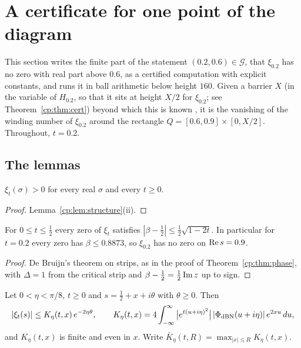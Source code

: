 \section{A certificate for one point of the diagram}\label{cp:sec:cert}

This section writes the finite part of the statement $(0.2,0.6)\in\mathcal G$, that $\xi_{0.2}$ has no zero with real part above $0.6$, as a certified computation with explicit constants, and runs it in ball arithmetic below height $160$. Given a barrier $X$ (in the variable of $H_{0.2}$, so that it sits at height $X/2$ for $\xi_{0.2}$; see Theorem~\ref{cp:thm:cert}) beyond which this is known \cite{Polymath}, it is the vanishing of the winding number of $\xi_{0.2}$ around the rectangle $Q=[0.6,0.9]\times[0,X/2]$. Throughout, $t=0.2$.

\subsection{The lemmas}\label{cp:sec:lemmas}

\begin{lemma}\label{cp:lem:bottom}
$\xi_t(\sigma)>0$ for every real $\sigma$ and every $t\ge0$.
\end{lemma}

\begin{proof}
Lemma~\ref{cp:lem:structure}(ii).
\end{proof}

\begin{lemma}\label{cp:lem:right}
For $0\le t\le\frac12$ every zero of $\xi_t$ satisfies $|\beta-\frac12|\le\frac12\sqrt{1-2t}$. In particular for $t=0.2$ every zero has $\beta\le0.8873$, so $\xi_{0.2}$ has no zero on $\operatorname{Re} s=0.9$.
\end{lemma}

\begin{proof}
De Bruijn's theorem on strips, as in the proof of Theorem~\ref{cp:thm:phase}, with $\Delta=1$ from the critical strip and $\beta-\frac12=\frac12\operatorname{Im} z$ up to sign.
\end{proof}

\begin{lemma}\label{cp:lem:tilt}
Let $0<\eta<\pi/8$, $t\ge0$ and $s=\frac12+x+i\theta$ with $\theta\ge0$. Then
\[
|\xi_t(s)|\le K_\eta(t,x)\,e^{-2\eta\theta},\qquad K_\eta(t,x)=4\int_{-\infty}^{\infty}\big|e^{t(u+i\eta)^2}\big|\,|\Phi_{\rm dBN}(u+i\eta)|\,e^{2xu}\,du,
\]
and $K_\eta(t,x)$ is finite and even in $x$. Write $\bar K_\eta(t,R)=\max_{|x|\le R}K_\eta(t,x)$.
\end{lemma}

